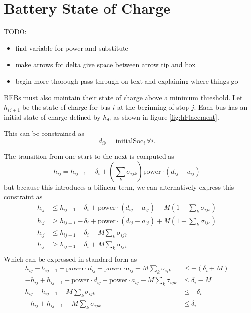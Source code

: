 \section{Battery State of Charge}
TODO:
\begin{itemize}
	\item find variable for power and substitute
	\item make arrows for delta give space between arrow tip and box
	\item begin more thorough pass through on text and explaining where things go
\end{itemize}
BEBs must also maintain their state of charge above a minimum threshold. Let $h_{ij+1}$ be the state of charge for bus $i$ at the beginning of stop $j$. Each bus has an initial state of charge defined by $h_{i0}$ as shown in figure \ref{fig:hPlacement}. 

This can be constrained as
\begin{equation}
	d_{i0} = \text{initialSoc}_{i} \ \forall i.
\end{equation}

The transition from one start to the next is computed as
\begin{equation}
	h_{ij} = h_{ij-1} - \delta_i + \left(\sum_k\sigma_{ijk}\right )\text{power}\cdot(d_{ij} - a_{ij}) 
\end{equation}
but because this introduces a bilinear term, we can alternatively express this constraint as
\begin{equation} \begin{aligned}
	h_{ij} & \le h_{ij-1} - \delta_i + \text{power}\cdot(d_{ij} - a_{ij}) - M(1 - \sum_k\sigma_{ijk})\\
	h_{ij} & \ge h_{ij-1} - \delta_i + \text{power}\cdot(d_{ij} - a_{ij}) + M(1 - \sum_k\sigma_{ijk})\\
	h_{ij} & \le h_{ij-1} - \delta_i - M\sum_k\sigma_{ijk}\\
	h_{ij} & \ge h_{ij-1} - \delta_i + M\sum_k\sigma_{ijk}\\
\end{aligned} \end{equation}
Which can be expressed in standard form as
\begin{equation} \begin{aligned}
	h_{ij} - h_{ij-1} - \text{power}\cdot d_{ij} + \text{power}\cdot a_{ij} - M\sum_k\sigma_{ijk} &\le -\left(\delta_i + M\right) \\
	-h_{ij} + h_{ij-1} + \text{power}\cdot d_{ij} - \text{power}\cdot a_{ij} - M\sum_k\sigma_{ijk} &\le \delta_i - M \\
	h_{ij} - h_{ij-1} + M\sum_k\sigma_{ijk} &\le -\delta_i \\
	-h_{ij} + h_{ij-1} + M\sum_k\sigma_{ijk} & \le \delta_i \\
\end{aligned} \end{equation}
